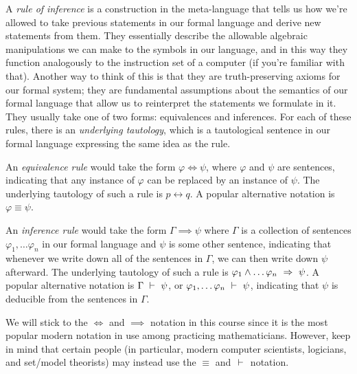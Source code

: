 \begin{definition}
    A \emph{rule of inference} is a construction in the meta-language that tells us
    how we're allowed to take previous statements in our formal language and derive new statements from them.
    They essentially describe the allowable algebraic manipulations we can make to the symbols in our language,
    and in this way they function analogously to the instruction set of a computer
    (if you're familiar with that).
    Another way to think of this is that they are truth-preserving axioms for our formal system;
    they are fundamental assumptions about the semantics of our formal language
    that allow us to reinterpret the statements we formulate in it.
    They usually take one of two forms: equivalences and inferences.
    For each of these rules, there is an \emph{underlying tautology},
    which is a tautological sentence in our formal language expressing the same idea as the rule.

    An \emph{equivalence rule} would take the form $\varphi \iff \psi$,
    where $\varphi$ and $\psi$ are sentences,
    indicating that any instance of $\varphi$ can be replaced by an instance of $\psi$.
    The underlying tautology of such a rule is $p \leftrightarrow q$.
    A popular alternative notation is $\varphi \equiv \psi$.

    An \emph{inference rule} would take the form $\Gamma \implies \psi$
    where $\Gamma$ is a collection of sentences
    $\varphi_1, \dots \varphi_n$ in our formal language
    and $\psi$ is some other sentence,
    indicating that whenever we write down all of the sentences in $\Gamma$,
    we can then write down $\psi$ afterward.
    The underlying tautology of such a rule is
    $\varphi_1 \wedge \dots \varphi_n ~\Rightarrow~ \psi$.
    A popular alternative notation is $\Gamma ~\vdash~ \psi$, or $\varphi_1, \dots \varphi_n ~\vdash~ \psi$,
    indicating that $\psi$ is deducible from the sentences in $\Gamma$.

    We will stick to the $\iff$ and $\implies$ notation in this course
    since it is the most popular modern notation in use among practicing mathematicians.
    However, keep in mind that certain people
    (in particular, modern computer scientists, logicians, and set/model theorists)
    may instead use the $\equiv$ and $~\vdash~$ notation.
\end{definition}


